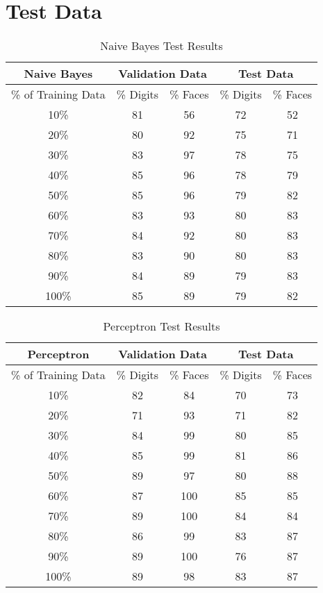 \documentclass{article}
\begin{document}
\section{Test Data}
\begin{table}[!htb]
	\centering
	\caption{Naive Bayes Test Results}
	\begin{tabular}{|*{5}{c|}|}
		\hline
		Naive Bayes & \multicolumn{2}{c|}{Validation Data} & \multicolumn{2}{c|}{Test Data}  \\
		\hline
		\% of Training Data & \% Digits & \% Faces & \% Digits & \% Faces \\
		\hline
		10\%  & 81    & 56    & 72    & 52 \\
		20\%  & 80    & 92    & 75    & 71 \\
		30\%  & 83    & 97    & 78    & 75 \\
		40\%  & 85    & 96    & 78    & 79 \\
		50\%  & 85    & 96    & 79    & 82 \\
		60\%  & 83    & 93    & 80    & 83 \\
		70\%  & 84    & 92    & 80    & 83 \\
		80\%  & 83    & 90    & 80    & 83 \\
		90\%  & 84    & 89    & 79    & 83 \\
		100\% & 85    & 89    & 79    & 82 \\
		\hline
	\end{tabular}%
\end{table}%
\begin{table}[!htb]
	\centering
	\caption{Perceptron Test Results}
	\begin{tabular}{|*{5}{c|}|}
		\hline
		Perceptron & \multicolumn{2}{c|}{Validation Data} & \multicolumn{2}{c|}{Test Data} \\
		\hline
		\% of Training Data & \% Digits & \% Faces & \% Digits & \% Faces \\
		\hline
		10\%  & 82    & 84    & 70    & 73 \\
		20\%  & 71    & 93    & 71    & 82 \\
		30\%  & 84    & 99    & 80    & 85 \\
		40\%  & 85    & 99    & 81    & 86 \\
		50\%  & 89    & 97    & 80    & 88 \\
		60\%  & 87    & 100   & 85    & 85 \\
		70\%  & 89    & 100   & 84    & 84 \\
		80\%  & 86    & 99    & 83    & 87 \\
		90\%  & 89    & 100   & 76    & 87 \\
		100\% & 89    & 98    & 83    & 87 \\
		\hline
	\end{tabular}%
\end{table}%
\end{document}
